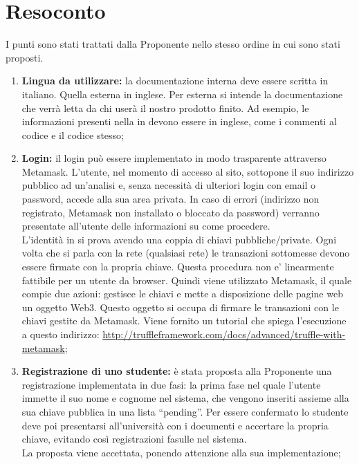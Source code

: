 \documentclass[VER-2017-11-22.tex]{subfiles}
\begin{document}
\chapter{Resoconto}
I punti sono stati trattati dalla Proponente nello stesso ordine in cui sono stati proposti.
\begin{enumerate}
	\item \textbf{Lingua da utilizzare:} la documentazione interna deve essere scritta in italiano. Quella esterna in inglese. Per esterna si intende la documentazione che verrà letta da chi userà il nostro prodotto finito. Ad esempio, le informazioni presenti nella  in  devono essere in inglese, come i commenti al codice e il codice stesso;
	\item \textbf{Login:} il login può essere implementato in modo trasparente attraverso Metamask. L’utente, nel momento di accesso al sito, sottopone il suo indirizzo pubblico ad un'analisi e, senza necessità di ulteriori login con email o password, accede alla sua area privata. In caso di errori (indirizzo non registrato, Metamask non installato o bloccato da password) verranno presentate all'utente delle informazioni su come procedere.\\	
	L'identità in  si prova avendo una coppia di chiavi pubbliche/private. Ogni volta che si parla con la rete  (qualsiasi rete) le transazioni sottomesse devono essere firmate con la propria chiave. Questa procedura non e' linearmente fattibile per un utente da browser. Quindi viene utilizzato Metamask, il quale compie due azioni: gestisce le chiavi e mette a disposizione delle pagine web un oggetto Web3. Questo oggetto si occupa di firmare le transazioni con le chiavi gestite da Metamask. Viene fornito un tutorial che spiega l'esecuzione a questo indirizzo: \href{http://truffleframework.com/docs/advanced/truffle-with-metamask}{http://truffleframework.com/docs/advanced/truffle-with-metamask};
	
	\item \textbf{Registrazione di uno studente:} è stata proposta alla Proponente una registrazione implementata in due fasi: la prima fase nel quale l’utente immette il suo nome e cognome nel sistema, che vengono inseriti assieme alla sua chiave pubblica in una lista “pending”. Per essere confermato lo studente deve poi presentarsi all’università con i documenti e accertare la propria chiave, evitando così registrazioni fasulle nel sistema.\\	
	La proposta viene accettata, ponendo attenzione alla sua implementazione;
	

\end{enumerate}
\end{document}
